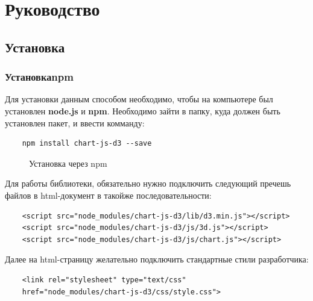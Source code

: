\documentclass[a4paper,14pt]{extreport}
\begin{document}
\chapter{Руководство}
\section{Установка}
\subsection{Установка\enspace npm}
\hspace{4ex}Для установки данным способом необходимо, чтобы на компьютере был установлен \textbf{node.js} и \textbf{npm}.
\hspace{4ex}Необходимо зайти в папку, куда должен быть установлен пакет, и ввести комманду:
\begin{verbatim}
    npm install chart-js-d3 --save
\end{verbatim}
\begin{figure}[h]
\caption{Установка через npm}
\label{ris:image}
\end{figure}
\hspace{4ex}Для работы библиотеки, обязательно нужно подключить следующий пречешь файлов в html-документ в такойже последовательности:
\begin{verbatim}
    <script src="node_modules/chart-js-d3/lib/d3.min.js"></script>
    <script src="node_modules/chart-js-d3/js/3d.js"></script>
    <script src="node_modules/chart-js-d3/js/chart.js"></script>
\end{verbatim}
\hspace{4ex}Далее на html-страницу желательно подключить стандартные стили разработчика:
\begin{verbatim}
    <link rel="stylesheet" type="text/css" 
    href="node_modules/chart-js-d3/css/style.css">
\end{verbatim} 
\end{document}
